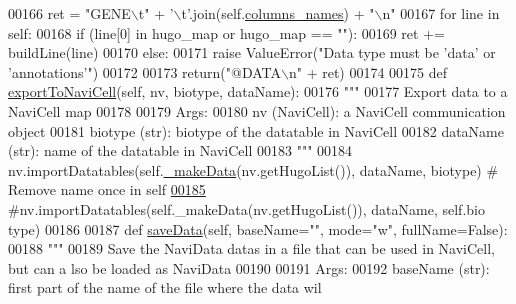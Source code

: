 \begin{DoxyCode}
00166             ret = \textcolor{stringliteral}{"GENE\(\backslash\)t"} + \textcolor{stringliteral}{'\(\backslash\)t'}.join(self.\hyperlink{classnavicom_1_1navidata_1_1NaviData_aebce9bba220d01776cbd5a214d2d3013}{columns_names}) + \textcolor{stringliteral}{"\(\backslash\)n"}
00167             \textcolor{keywordflow}{for} line \textcolor{keywordflow}{in} self:
00168                 \textcolor{keywordflow}{if} (line[0] \textcolor{keywordflow}{in} hugo\_map \textcolor{keywordflow}{or} hugo\_map == \textcolor{stringliteral}{""}):
00169                     ret += buildLine(line)
00170         \textcolor{keywordflow}{else}:
00171             \textcolor{keywordflow}{raise} ValueError(\textcolor{stringliteral}{"Data type must be 'data' or 'annotations'"})
00172 
00173         \textcolor{keywordflow}{return}(\textcolor{stringliteral}{"@DATA\(\backslash\)n"} + ret)
00174 
00175     \textcolor{keyword}{def }\hyperlink{classnavicom_1_1navidata_1_1NaviData_a485fbc0ffff49b94f3736b2a0f8cb54e}{exportToNaviCell}(self, nv, biotype, dataName):
00176         \textcolor{stringliteral}{"""}
00177 \textcolor{stringliteral}{        Export data to a NaviCell map}
00178 \textcolor{stringliteral}{        }
00179 \textcolor{stringliteral}{        Args:}
00180 \textcolor{stringliteral}{            nv (NaviCell): a NaviCell communication object}
00181 \textcolor{stringliteral}{            biotype (str): biotype of the datatable in NaviCell}
00182 \textcolor{stringliteral}{            dataName (str): name of the datatable in NaviCell}
00183 \textcolor{stringliteral}{        """}
00184         nv.importDatatables(self.\hyperlink{classnavicom_1_1navidata_1_1NaviData_a26d914914312eb5cceb517eb41128056}{_makeData}(nv.getHugoList()), dataName, biotype) 
      \textcolor{comment}{# Remove name once in self}
\hypertarget{navidata_8py_source_l00185}{}\hyperlink{classnavicom_1_1navidata_1_1NaviData_a485fbc0ffff49b94f3736b2a0f8cb54e}{00185}         \textcolor{comment}{#nv.importDatatables(self.\_makeData(nv.getHugoList()), dataName, self.bio
      type)}
00186 
00187     \textcolor{keyword}{def }\hyperlink{classnavicom_1_1navidata_1_1NaviData_a3dfc92056e5fc254e80607cef39234bf}{saveData}(self, baseName="", mode="w", fullName=False):
00188         \textcolor{stringliteral}{"""}
00189 \textcolor{stringliteral}{        Save the NaviData datas in a file that can be used in NaviCell, but can a
      lso be loaded as NaviData}
00190 \textcolor{stringliteral}{}
00191 \textcolor{stringliteral}{        Args:}
00192 \textcolor{stringliteral}{            baseName (str): first part of the name of the file where the data wil
}
\end{DoxyCode}
